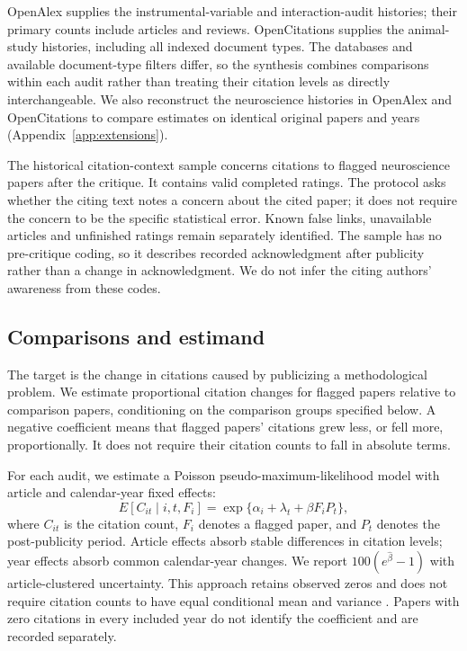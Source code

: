 \documentclass[11pt,letterpaper]{article}
\begin{document}
OpenAlex supplies the instrumental-variable and interaction-audit histories; their primary counts include articles and reviews. OpenCitations supplies the animal-study histories, including all indexed document types. The databases and available document-type filters differ, so the synthesis combines comparisons within each audit rather than treating their citation levels as directly interchangeable. We also reconstruct the neuroscience histories in OpenAlex and OpenCitations to compare estimates on identical original papers and years (Appendix~\ref{app:extensions}).

The historical citation-context sample concerns citations to flagged neuroscience papers after the critique. It contains \Rated{} valid completed ratings. The protocol asks whether the citing text notes a concern about the cited paper; it does not require the concern to be the specific statistical error. Known false links, unavailable articles and unfinished ratings remain separately identified. The sample has no pre-critique coding, so it describes recorded acknowledgment after publicity rather than a change in acknowledgment. We do not infer the citing authors' awareness from these codes.

\subsection{Comparisons and estimand}
The target is the change in citations caused by publicizing a methodological problem. We estimate proportional citation changes for flagged papers relative to comparison papers, conditioning on the comparison groups specified below. A negative coefficient means that flagged papers' citations grew less, or fell more, proportionally. It does not require their citation counts to fall in absolute terms.

For each audit, we estimate a Poisson pseudo-maximum-likelihood model with article and calendar-year fixed effects:
\[
 E[C_{it}\mid i,t,F_i]=\exp\{\alpha_i+\lambda_t+\beta F_i P_t\},
\]
where $C_{it}$ is the citation count, $F_i$ denotes a flagged paper, and $P_t$ denotes the post-publicity period. Article effects absorb stable differences in citation levels; year effects absorb common calendar-year changes. We report $100(e^{\widehat\beta}-1)$ with article-clustered uncertainty. This approach retains observed zeros and does not require citation counts to have equal conditional mean and variance \citep{santos2006}. Papers with zero citations in every included year do not identify the coefficient and are recorded separately.
\end{document}
